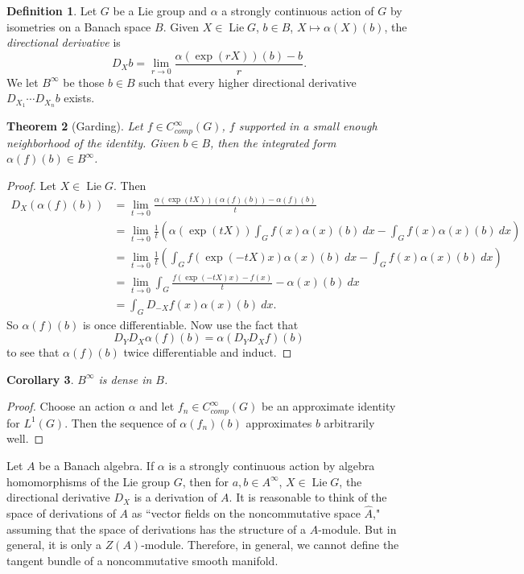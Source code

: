 \documentclass[12pt]{report}
\newcommand{\Lie}{\operatorname{Lie}}
\newcommand{\dfn}[1]{\emph{#1}\index{#1}}
\newtheorem{theorem}{Theorem}[chapter]
\newtheorem{corollary}[theorem]{Corollary}
\theoremstyle{definition}
\newtheorem{definition}[theorem]{Definition}
\begin{document}
\begin{definition}
    Let $G$ be a Lie group and $\alpha$ a strongly continuous action of $G$ by isometries on a Banach space $B$. Given $X \in \Lie G$, $b \in B$, $X \mapsto \alpha(X)(b)$, the \dfn{directional derivative} is
    $$D_Xb = \lim_{r \to 0} \frac{\alpha(\exp(rX))(b) - b}{r}.$$
    We let $B^\infty$ be those $b \in B$ such that every higher directional derivative $D_{X_1} \cdots D_{X_n} b$ exists.
\end{definition}
\begin{theorem}[Garding]
    Let $f \in C^\infty_{comp}(G)$, $f$ supported in a small enough neighborhood of the identity. Given $b \in B$, then the integrated form $\alpha(f)(b) \in B^\infty$.
\end{theorem}
\begin{proof}
    Let $X \in \Lie G$. Then
\begin{align*}D_X(\alpha(f)(b)) &= \lim_{t \to 0} \frac{\alpha(\exp(tX))(\alpha(f)(b)) - \alpha(f)(b)}{t} \\
    &= \lim_{t \to 0} \frac{1}{t}\left(\alpha(\exp(tX))\int_G f(x)\alpha(x)(b) ~dx - \int_G f(x)\alpha(x)(b) ~dx \right)\\
    &= \lim_{t \to 0} \frac{1}{t}\left(\int_G f(\exp(-tX)x) \alpha(x)(b) ~dx - \int_G f(x) \alpha(x)(b) ~dx\right)\\
    &= \lim_{t \to 0} \int_G \frac{f(\exp(-tX)x) - f(x)}{t} - \alpha(x)(b) ~dx\\
    &= \int_G D_{-X}f(x)\alpha(x)(b) ~dx.
    \end{align*}
    So $\alpha(f)(b)$ is once differentiable. Now use the fact that
    $$D_YD_X\alpha(f)(b) = \alpha(D_YD_Xf)(b)$$
    to see that $\alpha(f)(b)$ twice differentiable and induct.
\end{proof}
\begin{corollary}
    $B^\infty$ is dense in $B$.
\end{corollary}
\begin{proof}
    Choose an action $\alpha$ and let $f_n \in C^\infty_{comp}(G)$ be an approximate identity for $L^1(G)$. Then the sequence of $\alpha(f_n)(b)$ approximates $b$ arbitrarily well.
\end{proof}
    Let $A$ be a Banach algebra. If $\alpha$ is a strongly continuous action by algebra homomorphisms of the Lie group $G$, then for $a,b \in A^\infty$, $X \in \Lie G$, the directional derivative $D_X$ is a derivation of $A$. It is reasonable to think of the space of derivations of $A$ as ``vector fields on the noncommutative space $\hat A$," assuming that the space of derivations has the structure of a $A$-module. But in general, it is only a $Z(A)$-module. Therefore, in general, we cannot define the tangent bundle of a noncommutative smooth manifold.
\end{document}
